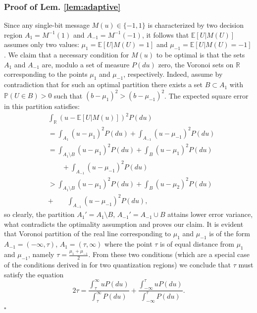 \documentclass[letterpaper, conference,9pt]{IEEEtran}      %
\newcommand*{\QEDA}{\hfill\ensuremath{\square}}
\begin{document}
\subsubsection*{Proof of Lem. \ref{lem:adaptive}}
Since any single-bit message $M(u) \in \{-1,1\}$ is characterized by two decision region $A_1 = M^{-1}(1)$ and $A_{-1} = M^{-1}(-1)$, it follows that $\mathbb E \left[ U | M(U) \right]$ assumes only two values: $\mu_1 = \mathbb E \left[ U | M(U) = 1 \right]$ and $\mu_{-1} = \mathbb E \left[ U | M(U) = -1 \right]$. We claim that a necessary condition for $M(u)$ to be optimal is that the sets $A_1$ and $A_{-1}$ are, modulo a set of measure $P(du)$ zero, the Voronoi sets on $\mathbb R$ corresponding to the points $\mu_1$ and $\mu_{-1}$, respectively. Indeed, assume by contradiction that for such an optimal partition there exists a set $B \subset A_{1}$ with $\mathbb P (U \in B) >0$ such that $\left( b-\mu_{1} \right)^2 > \left( b- \mu_{-1} \right)^2$. The expected square error in this partition satisfies:
\begin{align*}
& \int_{\mathbb R} \left( u - \mathbb E[U|M(u)]  \right)^2 P(du) \\
& = \int_{A_1} (u- \mu_1)^2 P(du) + \int_{A_{-1}} (u- \mu_{-1})^2 P(du) \\
& = \int_{A_1\setminus B} (u- \mu_1)^2 P(du) +  \int_{B} (u- \mu_1)^2 P(du) \\
&\quad \quad + \int_{A_{-1}} (u- \mu_{-1})^2 P(du) \\
& > \int_{A_1\setminus B} (u- \mu_1)^2 P(du) +  \int_{B} (u- \mu_2)^2 P(du) \\
& + \quad \quad  \int_{A_{-1}} (u- \mu_{-1})^2 P(du),
\end{align*}
so clearly, the partition $A_1' = A_1 \setminus B$, $A_{-1}' = A_{-1} \cup B$ attains lower error variance, what contradicts the optimality assumption and proves our claim. It is evident that Voronoi partition of the real line corresponding to $\mu_1$ and $\mu_{-1}$ is of the form $A_{-1} = (-\infty,\tau)$, $A_{1} = (\tau, \infty)$ where the point $\tau$ is of equal distance from $\mu_1$ and $\mu_{-1}$, namely $\tau = \frac{\mu_1 + \mu_{-1}}{2}$. From these two conditions (which are a special case of the conditions derived in \cite{1056489} for two quantization regions) we conclude that $\tau$ must satisfy the equation
\[
2 \tau = \frac{\int_{\tau}^\infty u P(du)}{\int_{\tau}^\infty P(du)} + \frac{\int_{-\infty}^{\tau} u P(du)}{\int_{-\infty}^{\tau} P(du)}.
\] 
\QEDA
\end{document}
